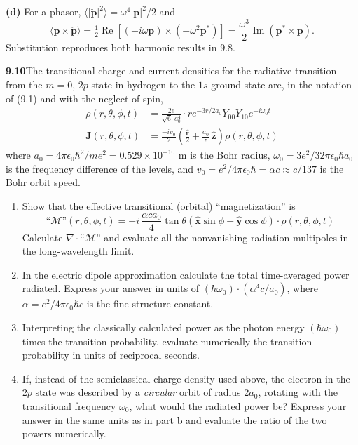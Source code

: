 \textbf{(d)} For a phasor,
$\langle|\ddot{\mathbf p}|^2\rangle=\omega^4|\mathbf p|^2/2$ and
\[
\langle\dot{\mathbf p}\times\ddot{\mathbf p}\rangle
=\tfrac12\operatorname{Re}[(-i\omega\mathbf p)
\times(-\omega^2\mathbf p^*)]
=\frac{\omega^3}{2}\operatorname{Im}(\mathbf p^*\times\mathbf p).
\]
Substitution reproduces both harmonic results in 9.8.

\par\bigskip
\noindent\textbf{9.10}\quad The transitional charge and current densities for the radiative transition from the $m=0$, $2p$ state in hydrogen to the $1s$ ground state are, in the notation of (9.1) and with the neglect of spin,
\begin{align*}
\rho(r,\theta,\phi,t)&=\frac{2e}{\sqrt{6}\;a_{0}^{4}}\cdot re^{-3r/2a_{0}}Y_{00}Y_{10}e^{-i\omega_{0}t}\\[4pt]
\mathbf{J}(r,\theta,\phi,t)&=\frac{-iv_{0}}{2}\left(\frac{\hat{\mathbf{r}}}{2}+\frac{a_{0}}{z}\,\hat{\mathbf{z}}\right)\!\rho(r,\theta,\phi,t)
\end{align*}
where $a_{0}=4\pi\epsilon_{0}\hbar^{2}/me^{2}=0.529\times10^{-10}$ m is the Bohr radius, $\omega_{0}=3e^{2}/32\pi\epsilon_{0}\hbar a_{0}$ is the frequency difference of the levels, and $v_{0}=e^{2}/4\pi\epsilon_{0}\hbar=\alpha c\approx c/137$ is the Bohr orbit speed.
\begin{enumerate}
\item[(a)] Show that the effective transitional (orbital) ``magnetization'' is
\[
\text{``}\mathcal{M}\text{''}(r,\theta,\phi,t)=-i\,\frac{\alpha ca_{0}}{4}\tan\theta(\hat{\mathbf{x}}\sin\phi-\hat{\mathbf{y}}\cos\phi)\cdot\rho(r,\theta,\phi,t)
\]
Calculate $\nabla\cdot\text{``}\mathcal{M}\text{''}$ and evaluate all the nonvanishing radiation multipoles in the long-wavelength limit.
\item[(b)] In the electric dipole approximation calculate the total time-averaged power radiated. Express your answer in units of $(\hbar\omega_{0})\cdot(\alpha^{4}c/a_{0})$, where $\alpha=e^{2}/4\pi\epsilon_{0}\hbar c$ is the fine structure constant.
\item[(c)] Interpreting the classically calculated power as the photon energy $(\hbar\omega_{0})$ times the transition probability, evaluate numerically the transition probability in units of reciprocal seconds.
\item[(d)] If, instead of the semiclassical charge density used above, the electron in the $2p$ state was described by a \emph{circular}  orbit of radius $2a_{0}$, rotating with the transitional frequency $\omega_{0}$, what would the radiated power be? Express your answer in the same units as in part b and evaluate the ratio of the two powers numerically.
\end{enumerate}
\solution

